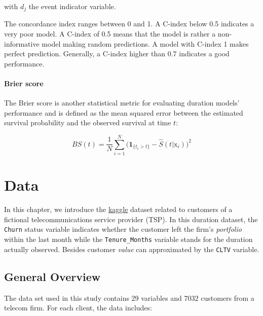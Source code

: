 \documentclass[
]{book}
\begin{document}
with \(d_j\) the event indicator variable.

The concordance index ranges between 0 and 1. A C-index below 0.5 indicates a very poor model. A C-index of 0.5 means that the model is rather a non-informative model making random predictions. A model with C-index 1 makes perfect prediction. Generally, a C-index higher than 0.7 indicates a good performance.

\hypertarget{brier-score}{%
\subsubsection*{Brier score}\label{brier-score}}

The Brier score is another statistical metric for evaluating duration models' performance and is defined as the mean squared error between the estimated survival probability and the observed survival at time \(t\):

\begin{equation}
  BS(t) = \frac{1}{N} \sum_{i=1}^{N} \Big(\pmb{1}_{\{t_i>t\}} - \hat{S}(t|\mathrm{x}_i) \Big)^2
  \label{eq:brier}
\end{equation}

\hypertarget{data}{%
\chapter{Data}\label{data}}

In this chapter, we introduce the \href{https://www.kaggle.com/yeanzc/telco-customer-churn-ibm-dataset}{kaggle} dataset related to customers of a fictional telecommunications service provider (TSP). In this duration dataset, the \texttt{Churn} status variable indicates whether the customer left the firm's \emph{portfolio} within the last month while the \texttt{Tenure\_Months} variable stands for the duration actually observed. Besides customer \emph{value} can approximated by the \texttt{CLTV} variable.

\hypertarget{general-overview}{%
\section{General Overview}\label{general-overview}}

The data set used in this study contains 29 variables and 7032 customers from a telecom firm. For each client, the data includes:
\end{document}
